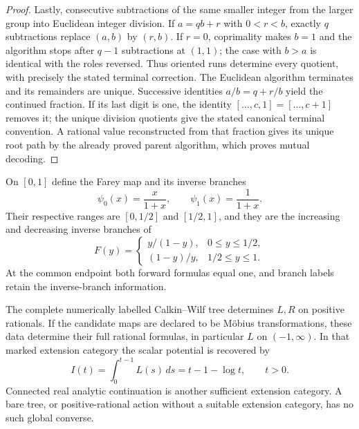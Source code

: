 \begin{proof}
Lastly, consecutive subtractions of the same smaller integer from
the larger group into Euclidean integer division.  If $a=qb+r$ with
$0<r<b$, exactly $q$ subtractions replace $(a,b)$ by $(r,b)$.
If $r=0$, coprimality makes $b=1$ and the algorithm stops after
$q-1$ subtractions at $(1,1)$; the case with $b>a$ is identical
with the roles reversed.  Thus oriented runs determine every
quotient, with precisely the stated terminal correction.  The
Euclidean algorithm terminates and its remainders are unique.
Successive identities $a/b=q+r/b$ yield the continued fraction.
If its last digit is one, the identity
$[\ldots,c,1]=[\ldots,c+1]$ removes it; the unique division
quotients give the stated canonical terminal convention.  A rational
value reconstructed from that fraction gives its unique root path
by the already proved parent algorithm, which proves mutual decoding.
\end{proof}

\begin{proposition}
\label{final:B2}
On $[0,1]$ define the Farey map and its inverse branches~\cite{IsolaFarey}
\[
 \psi_0(x)=\frac{x}{1+x},\qquad \psi_1(x)=\frac1{1+x}.
\]
Their respective ranges are $[0,1/2]$ and $[1/2,1]$, and they are
the increasing and decreasing inverse branches of
\[
 F(y)=
 \begin{cases}
 y/(1-y),&0\leq y\leq1/2,\\
 (1-y)/y,&1/2\leq y\leq1.
 \end{cases}
\]
At the common endpoint both forward formulas equal one, and branch
labels retain the inverse-branch information.

The complete numerically labelled Calkin--Wilf tree determines $L,R$
on positive rationals.  If the candidate maps are declared to be
M\"obius transformations, these data determine their full rational
formulas, in particular $L$ on $(-1,\infty)$.  In that marked
extension category the scalar potential is recovered by
\begin{equation}\label{final:tree-integral}
 I(t)=\int_0^{t-1}L(s)\,ds=t-1-\log t,\qquad t>0.
\end{equation}
Connected real analytic continuation is another sufficient extension
category.  A bare tree, or positive-rational action without a suitable
extension category, has no such global converse.
\end{proposition}

